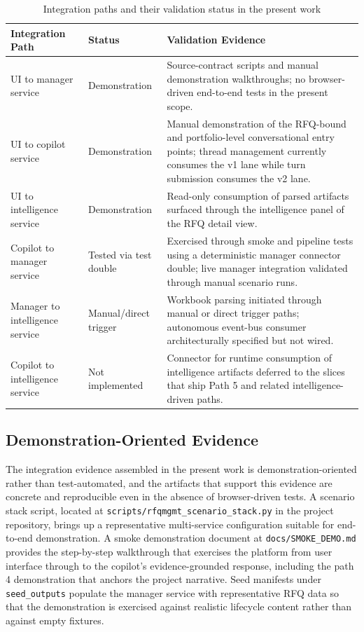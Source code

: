 \begin{table}[H]
\centering
\renewcommand{\arraystretch}{1.4}
\begin{tabular}{|p{4cm}|p{3cm}|p{6.5cm}|}
\hline
\rowcolor{lightgray}
\textbf{Integration Path} & \textbf{Status} & \textbf{Validation Evidence} \\ \hline
UI to manager service & Demonstration & Source-contract scripts and manual demonstration walkthroughs; no browser-driven end-to-end tests in the present scope. \\ \hline
UI to copilot service & Demonstration & Manual demonstration of the RFQ-bound and portfolio-level conversational entry points; thread management currently consumes the v1 lane while turn submission consumes the v2 lane. \\ \hline
UI to intelligence service & Demonstration & Read-only consumption of parsed artifacts surfaced through the intelligence panel of the RFQ detail view. \\ \hline
Copilot to manager service & Tested via test double & Exercised through smoke and pipeline tests using a deterministic manager connector double; live manager integration validated through manual scenario runs. \\ \hline
Manager to intelligence service & Manual/direct trigger & Workbook parsing initiated through manual or direct trigger paths; autonomous event-bus consumer architecturally specified but not wired. \\ \hline
Copilot to intelligence service & Not implemented & Connector for runtime consumption of intelligence artifacts deferred to the slices that ship Path 5 and related intelligence-driven paths. \\ \hline
\end{tabular}
\caption{Integration paths and their validation status in the present work}
\label{tab:integration}
\end{table}

\subsection{Demonstration-Oriented Evidence}
The integration evidence assembled in the present work is demonstration-oriented rather than test-automated, and the artifacts that support this evidence are concrete and reproducible even in the absence of browser-driven tests. A scenario stack script, located at \texttt{scripts/rfqmgmt\_scenario\_stack.py} in the project repository, brings up a representative multi-service configuration suitable for end-to-end demonstration. A smoke demonstration document at \texttt{docs/SMOKE\_DEMO.md} provides the step-by-step walkthrough that exercises the platform from user interface through to the copilot's evidence-grounded response, including the path 4 demonstration that anchors the project narrative. Seed manifests under \texttt{seed\_outputs} populate the manager service with representative RFQ data so that the demonstration is exercised against realistic lifecycle content rather than against empty fixtures.


